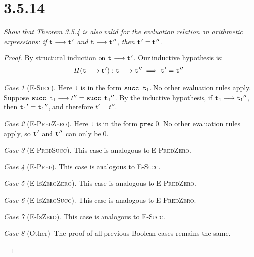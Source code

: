 \documentclass{article}
\newcommand{\term}[1]{\texttt{t\textsubscript{#1}}}
\newcommand{\ms}[1]{\texttt{#1}}
\theoremstyle{remark}
\newtheorem*{case}{Case}
\begin{document}
\section{3.5.14}

    \textit{Show that Theorem 3.5.4 is also valid for the evaluation relation}
    \textit{on arithmetic expressions: if} $\term{} \longrightarrow \term{}'$ \textit{and}
    $\term{} \longrightarrow \term{}''$, \textit{then} $\term{}' = \term{}''$.

    \begin{proof}
        By structural induction on $\term{} \longrightarrow \term{}'$. Our inductive hypothesis is:
        \begin{align*}
            H(\term{} \longrightarrow \term{}'): \term{} \longrightarrow \term{}'' \implies \term{}' = \term{}''
        \end{align*}

        \begin{case}[\textsc{E-Succ}]
            Here \term{} is in the form $\ms{succ \term{1}}$. No other evaluation rules apply.
            Suppose $\ms{succ \term{1}} \longrightarrow t''= \ms{succ \term{1}$''$}$.
            By the inductive hypothesis, if $\term{1} \longrightarrow \term{1}''$,
            then $\term{1}' = \term{1}''$, and therefore $t' = t''$.
        \end{case}

        \begin{case}[\textsc{E-PredZero}]
            Here \term{} is in the form $\ms{pred}\ 0$. No other evaluation rules apply,
            so $\term{}'$ and $\term{}''$ can only be $0$.
        \end{case}

        \begin{case}[\textsc{E-PredSucc}]
            This case is analogous to \textsc{E-PredZero}.
        \end{case}

        \begin{case}[\textsc{E-Pred}]
            This case is analogous to \textsc{E-Succ}.
        \end{case}

        \begin{case}[\textsc{E-IsZeroZero}]
            This case is analogous to \textsc{E-PredZero}.
        \end{case}

        \begin{case}[\textsc{E-IsZeroSucc}]
            This case is analogous to \textsc{E-PredZero}.
        \end{case}

        \begin{case}[\textsc{E-IsZero}]
            This case is analogous to \textsc{E-Succ}.
        \end{case}

        \begin{case}[Other]
            The proof of all previous Boolean cases remains the same.
        \end{case}
    \end{proof}
\end{document}
